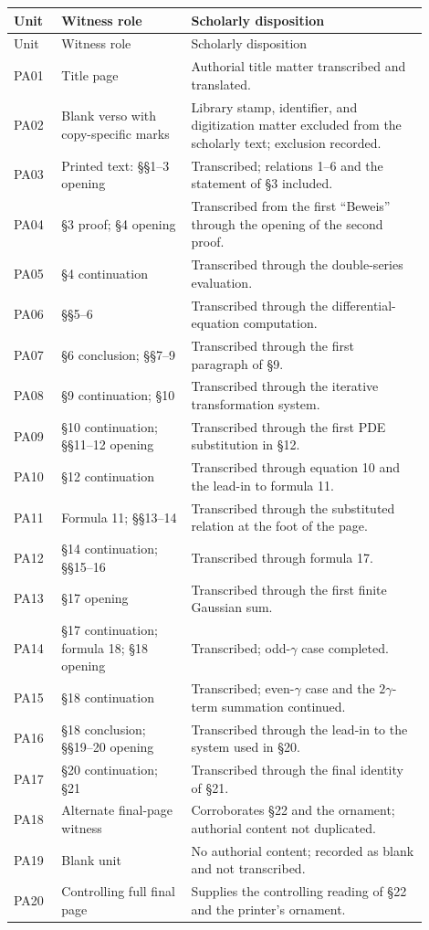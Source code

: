 \documentclass[10pt]{article}
\begin{document}
\renewcommand{\arraystretch}{1.12}
\begin{longtable}{>{\ttfamily}p{0.10\linewidth} >{\RaggedRight\arraybackslash}p{0.29\linewidth} >{\RaggedRight\arraybackslash}p{0.51\linewidth}}
\toprule
Unit & Witness role & Scholarly disposition \\
\midrule
\endfirsthead
\toprule
Unit & Witness role & Scholarly disposition \\
\midrule
\endhead
PA01 & Title page & Authorial title matter transcribed and translated. \\
PA02 & Blank verso with copy-specific marks & Library stamp, identifier, and digitization matter excluded from the scholarly text; exclusion recorded. \\
PA03 & Printed text: \S\S 1--3 opening & Transcribed; relations 1--6 and the statement of \S 3 included. \\
PA04 & \S 3 proof; \S 4 opening & Transcribed from the first ``Beweis'' through the opening of the second proof. \\
PA05 & \S 4 continuation & Transcribed through the double-series evaluation. \\
PA06 & \S\S 5--6 & Transcribed through the differential-equation computation. \\
PA07 & \S 6 conclusion; \S\S 7--9 & Transcribed through the first paragraph of \S 9. \\
PA08 & \S 9 continuation; \S 10 & Transcribed through the iterative transformation system. \\
PA09 & \S 10 continuation; \S\S 11--12 opening & Transcribed through the first PDE substitution in \S 12. \\
PA10 & \S 12 continuation & Transcribed through equation 10 and the lead-in to formula 11. \\
PA11 & Formula 11; \S\S 13--14 & Transcribed through the substituted relation at the foot of the page. \\
PA12 & \S 14 continuation; \S\S 15--16 & Transcribed through formula 17. \\
PA13 & \S 17 opening & Transcribed through the first finite Gaussian sum. \\
PA14 & \S 17 continuation; formula 18; \S 18 opening & Transcribed; odd-\(\gamma\) case completed. \\
PA15 & \S 18 continuation & Transcribed; even-\(\gamma\) case and the \(2\gamma\)-term summation continued. \\
PA16 & \S 18 conclusion; \S\S 19--20 opening & Transcribed through the lead-in to the system used in \S 20. \\
PA17 & \S 20 continuation; \S 21 & Transcribed through the final identity of \S 21. \\
PA18 & Alternate final-page witness & Corroborates \S 22 and the ornament; authorial content not duplicated. \\
PA19 & Blank unit & No authorial content; recorded as blank and not transcribed. \\
PA20 & Controlling full final page & Supplies the controlling reading of \S 22 and the printer's ornament. \\
\bottomrule
\end{longtable}
\end{document}
